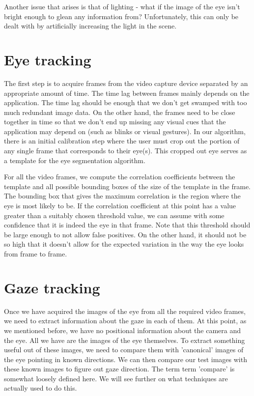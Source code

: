 \documentclass[12pt,letterpaper]{article}
\begin{document}
\begin{multicols}{2}
Another issue that arises is that of lighting - what if the image of the eye isn't bright enough to
glean any information from? Unfortunately, this can only be dealt with by artificially increasing the
light in the scene. 


\section{Eye tracking}
\label{scn:eyetrack}

The first step is to acquire frames from the video capture device separated by an appropriate amount of 
time. The time lag between frames mainly depends on the application. The time lag should be enough that
we don't get swamped with too much redundant image data. On the other hand, the frames need to be close 
together in time so that we don't end up missing any visual cues that the application may depend on (such 
as blinks or visual gestures). In our algorithm, there is an initial calibration step where the user must 
crop out the portion of any single frame that corresponds to their eye(s). This cropped out eye serves as
a template for the eye segmentation algorithm. 

For all the video frames, we compute the correlation coefficients between the template and all possible 
bounding boxes of the size of the template in the frame. The bounding box that gives the maximum 
correlation is the region where the eye is most likely to be. If the correlation coefficient at this point
has a value greater than a suitably chosen threshold value, we can assume with some confidence that it is
indeed the eye in that frame. Note that this threshold should be large enough to not allow false positives. 
On the other hand, it should not be so high that it doesn't allow for the expected variation in the way 
the eye looks from frame to frame.


\section{Gaze tracking}
\label{scn:gazetrack}

Once we have acquired the images of the eye from all the required video frames, we need to extract 
information about the gaze in each of them. At this point, as we mentioned before, we have no positional
information about the camera and the eye. All we have are the images of the eye themselves. To 
extract something useful out of these images, we need to compare them with 'canonical' images of the eye
pointing in known directions. We can then compare our test images with these known images to figure out
gaze direction. The term term 'compare' is somewhat loosely defined here. We will see further on
what techniques are actually used to do this. 


\end{multicols}
\end{document}
